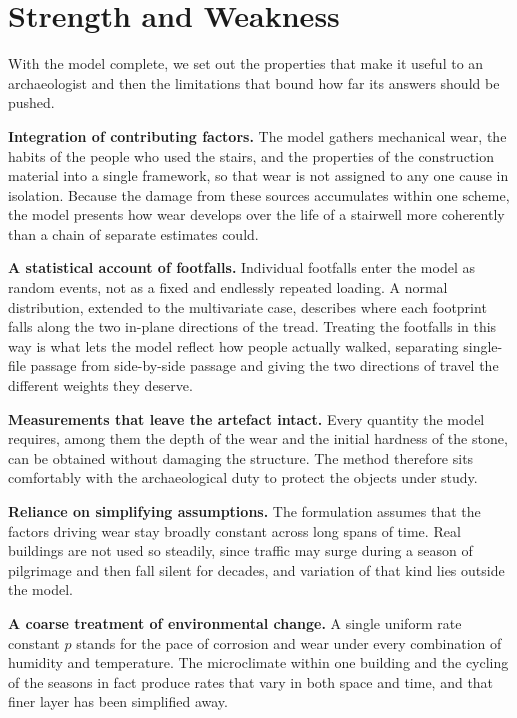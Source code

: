 \section{Strength and Weakness}

With the model complete, we set out the properties that make it useful to an archaeologist and then the limitations that bound how far its answers should be pushed.

\textbf{Integration of contributing factors.} The model gathers mechanical wear, the habits of the people who used the stairs, and the properties of the construction material into a single framework, so that wear is not assigned to any one cause in isolation. Because the damage from these sources accumulates within one scheme, the model presents how wear develops over the life of a stairwell more coherently than a chain of separate estimates could.

\textbf{A statistical account of footfalls.} Individual footfalls enter the model as random events, not as a fixed and endlessly repeated loading. A normal distribution, extended to the multivariate case, describes where each footprint falls along the two in-plane directions of the tread. Treating the footfalls in this way is what lets the model reflect how people actually walked, separating single-file passage from side-by-side passage and giving the two directions of travel the different weights they deserve.

\textbf{Measurements that leave the artefact intact.} Every quantity the model requires, among them the depth of the wear and the initial hardness of the stone, can be obtained without damaging the structure. The method therefore sits comfortably with the archaeological duty to protect the objects under study.

\textbf{Reliance on simplifying assumptions.} The formulation assumes that the factors driving wear stay broadly constant across long spans of time. Real buildings are not used so steadily, since traffic may surge during a season of pilgrimage and then fall silent for decades, and variation of that kind lies outside the model.

\textbf{A coarse treatment of environmental change.} A single uniform rate constant $p$ stands for the pace of corrosion and wear under every combination of humidity and temperature. The microclimate within one building and the cycling of the seasons in fact produce rates that vary in both space and time, and that finer layer has been simplified away.


